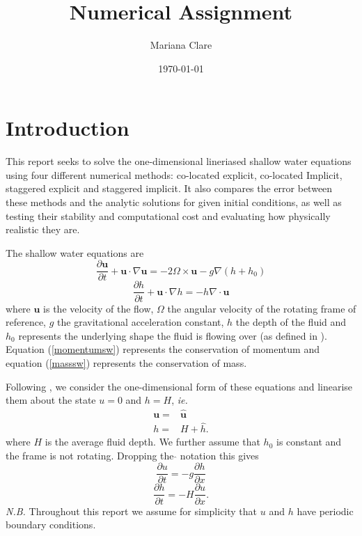 \documentclass[a4paper, 10.8pt, notitlepage]{article}
\title{Numerical Assignment}
\author{Mariana Clare}
\date{\today}
\begin{document}
	
\maketitle
\thispagestyle{empty}
\section{Introduction}
This report seeks to solve the one-dimensional lineriased shallow water equations using four different numerical methods: co-located explicit, co-located Implicit, staggered explicit and staggered implicit. It also compares the error between these methods and the analytic solutions for given initial conditions, as well as testing their stability and computational cost and evaluating how physically realistic they are.

The shallow water equations are
\begin{equation}\label{momentumsw}
\frac{\partial \mathbf{u}}{\partial t} + \mathbf{u}\cdot\nabla\mathbf{u} = - 2\Omega \times\mathbf{u} - g\nabla (h + h_{0})
\end{equation}
\begin{equation}\label{masssw}
\frac{\partial h}{\partial t} + \mathbf{u}\cdot\nabla h = - h \nabla \cdot \mathbf{u}
\end{equation}
where $\mathbf{u}$ is the velocity of the flow, $\Omega$ the angular velocity of the rotating frame of reference, $g$ the gravitational acceleration constant, $h$ the depth of the fluid and $h_{0}$ represents the underlying shape the fluid is flowing over (as defined in \cite{MPE textbook}). Equation (\ref{momentumsw}) represents the conservation of momentum and equation (\ref{masssw}) represents the conservation of mass.

Following \cite{MPE textbook}, we consider the one-dimensional form of these equations and linearise them about the state $u = 0$ and $h = H$, \textit{ie.}
\begin{eqnarray}
\mathbf{u} =  & \mathbf{\hat{u}}
 \\   \nonumber
h = &  H + \hat{h} .
\end{eqnarray}
where $H$ is the average fluid depth. We further assume that $h_{0}$ is constant and the frame is not rotating. Dropping the $\hat{}$ notation this gives
\begin{equation}\label{linearisedsw1}
\frac{\partial u}{\partial t} = - g \frac{\partial h}{\partial x}
\end{equation}
\begin{equation}\label{linearisedsw2}
\frac{\partial h}{\partial t} = - H \frac{\partial u}{\partial x}.
\end{equation}
\textit{N.B.} Throughout this report we assume for simplicity that $u$ and $h$ have periodic boundary conditions.
\end{document}
